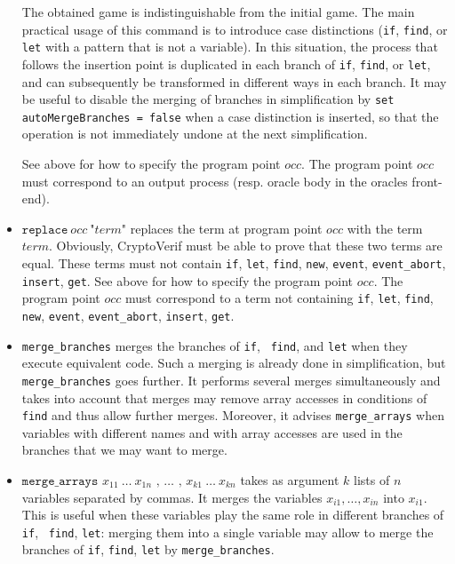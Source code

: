 \documentclass{article}
\begin{document}
\begin{itemize}
The obtained game is indistinguishable from the initial game.
The main practical usage of this command is to introduce case
distinctions ({\tt if}, {\tt find}, or {\tt let} with a pattern that
is not a variable). In this situation, the process that follows the
insertion point is duplicated in each branch of {\tt if}, {\tt find},
or {\tt let}, and can subsequently be transformed in different ways in
each branch. 
%
It may be useful to disable the merging of branches in simplification
by \texttt{set autoMergeBranches = false} when a case distinction is
inserted, so that the operation is not immediately undone at the next
simplification.

See above for how to specify the program point $occ$. 
The program point $occ$ must
correspond to an output process (resp. oracle body in the oracles
front-end).

\item $\texttt{replace}\ occ\ \texttt{"}term\texttt{"}$ replaces the term at program point
  $occ$ with the term $term$. Obviously, CryptoVerif must be able to
  prove that these two terms are equal.
  These terms must not contain \texttt{if}, \texttt{let},
  \texttt{find}, \texttt{new}, \texttt{event}, \texttt{event\_abort}, \texttt{insert}, \texttt{get}.
See above for how to specify the program point $occ$. 
The program point $occ$ must correspond to a term not containing \texttt{if}, \texttt{let},
  \texttt{find}, \texttt{new}, \texttt{event}, \texttt{event\_abort}, \texttt{insert}, \texttt{get}.

\item \texttt{merge\_branches} merges the branches of {\tt if}, {\tt
    find}, and {\tt let} when they execute equivalent code. Such a
  merging is already done in simplification, but
  \texttt{merge\_branches} goes further. It performs several merges
  simultaneously and takes into account that merges may remove array
  accesses in conditions of {\tt find} and thus allow further
  merges. Moreover, it advises {\tt merge\_arrays} when variables with
  different names and with array accesses are used in the branches
  that we may want to merge.

\item $\texttt{merge\_arrays } x_{11}\ \ldots\ x_{1n} \texttt{ , }
  \ldots \texttt{ , } x_{k1}\ \ldots\ x_{kn}$ takes as argument $k$
  lists of $n$ variables separated by commas. It merges the variables
  $x_{i1}, \ldots, x_{in}$ into $x_{i1}$. This is useful when these
  variables play the same role in different branches of {\tt if}, {\tt
    find}, {\tt let}: merging them into a single variable may allow to
  merge the branches of {\tt if}, {\tt find}, {\tt let} by
  \texttt{merge\_branches}. 


\end{itemize}
\end{document}
